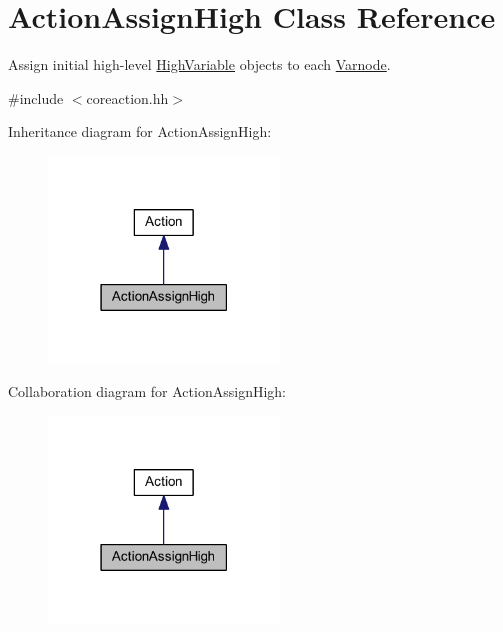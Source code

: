 \hypertarget{class_action_assign_high}{}\section{Action\+Assign\+High Class Reference}
\label{class_action_assign_high}


Assign initial high-\/level \mbox{\hyperlink{class_high_variable}{High\+Variable}} objects to each \mbox{\hyperlink{class_varnode}{Varnode}}.  




{\ttfamily \#include $<$coreaction.\+hh$>$}



Inheritance diagram for Action\+Assign\+High\+:
\nopagebreak
\begin{figure}[H]
\begin{center}
\leavevmode
\includegraphics[width=174pt]{class_action_assign_high__inherit__graph}
\end{center}
\end{figure}


Collaboration diagram for Action\+Assign\+High\+:
\nopagebreak
\begin{figure}[H]
\begin{center}
\leavevmode
\includegraphics[width=174pt]{class_action_assign_high__coll__graph}
\end{center}
\end{figure}
